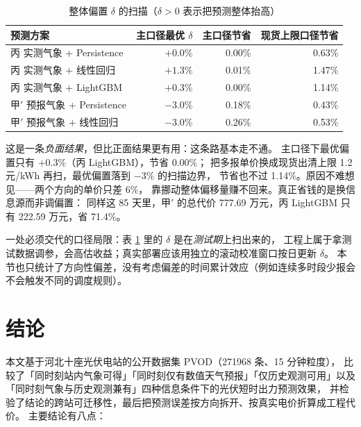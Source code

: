 \documentclass[11pt,a4paper]{ctexart}
\begin{document}
\begin{table}[htbp]
\centering
\caption{整体偏置 $\delta$ 的扫描（$\delta>0$ 表示把预测整体抬高）}
\label{tab:biascal}
\begin{tabular}{lrrr}
\toprule
预测方案 & 主口径最优 $\delta$ & 主口径节省 & 现货上限口径节省 \\
\midrule
丙 实测气象 + Persistence    & $+0.0$\% & 0.00\%  & 0.63\% \\
丙 实测气象 + 线性回归       & $+1.3$\% & 0.01\%  & 1.47\% \\
丙 实测气象 + LightGBM       & $+0.3$\% & 0.00\%  & 1.14\% \\
甲$'$ 预报气象 + Persistence  & $-3.0$\% & 0.18\%  & 0.43\% \\
甲$'$ 预报气象 + 线性回归     & $-3.0$\% & 0.26\%  & 0.53\% \\
\bottomrule
\end{tabular}
\end{table}

这是一条\emph{负面结果}，但比正面结果更有用：这条路基本走不通。
主口径下最优偏置只有 $+0.3\%$（丙 LightGBM），节省 0.00\%；
把多报单价换成现货出清上限 1.2\,元/kWh 再扫，最优偏置落到 $-3\%$ 的扫描边界，
节省也不过 1.14\%。原因不难想见——两个方向的单价只差 6\%，
靠挪动整体偏移量赚不回来。真正省钱的是换信息源而非调偏置：
同样这 85 天里，甲$'$ 的总代价 777.69 万元，丙 LightGBM 只有 222.59 万元，省 71.4\%。

一处必须交代的口径局限：表 \ref{tab:biascal} 里的 $\delta$ 是在\emph{测试期}上扫出来的，
工程上属于拿测试数据调参，会高估收益；真实部署应该用独立的滚动校准窗口按日更新 $\delta$。
本节也只统计了方向性偏差，没有考虑偏差的时间累计效应（例如连续多时段少报会不会触发不同的调度规则）。

\section{结论}
\label{sec:concl}

本文基于河北十座光伏电站的公开数据集 PVOD（271968 条、15 分钟粒度），
比较了「同时刻站内气象可得」「同时刻仅有数值天气预报」「仅历史观测可用」以及
「同时刻气象与历史观测兼有」四种信息条件下的光伏短时出力预测效果，
并检验了结论的跨站可迁移性，最后把预测误差按方向拆开、按真实电价折算成工程代价。
主要结论有八点：
\end{document}
